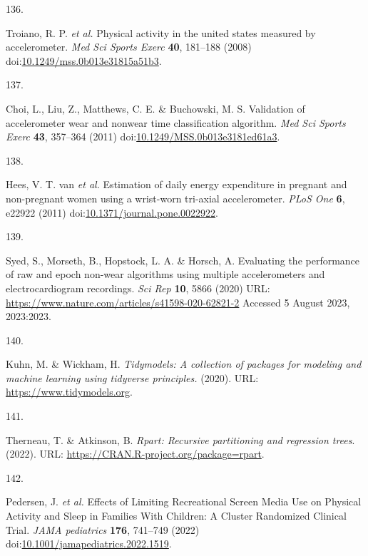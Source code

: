 \documentclass[
  10pt,
]{scrbook}
\newlength{\cslhangindent}
\newlength{\csllabelwidth}
\newlength{\cslentryspacingunit} %
\newenvironment{CSLReferences}[2] %
 {%
  \setlength{\parindent}{0pt}
  \ifodd #1
  \let\oldpar\par
  \def\par{\hangindent=\cslhangindent\oldpar}
  \fi
  \setlength{\parskip}{#2\cslentryspacingunit}
 }%
 {}
\newcommand{\CSLLeftMargin}[1]{\parbox[t]{\csllabelwidth}{#1}}
\newcommand{\CSLRightInline}[1]{\parbox[t]{\linewidth - \csllabelwidth}{#1}\break}
\let\originaltextbf\textbf
\renewcommand{\textbf}[1]{\textcolor{color1}{\originaltextbf{#1}}}
\begin{document}
\begin{CSLReferences}{0}{0}
\leavevmode{}%
\CSLLeftMargin{136. }%
\CSLRightInline{Troiano, R. P. \emph{et al.} Physical activity in the
united states measured by accelerometer. \emph{Med Sci Sports Exerc}
\textbf{40}, 181--188 (2008)
doi:\href{https://doi.org/10.1249/mss.0b013e31815a51b3}{10.1249/mss.0b013e31815a51b3}.}

\leavevmode{}%
\CSLLeftMargin{137. }%
\CSLRightInline{Choi, L., Liu, Z., Matthews, C. E. \& Buchowski, M. S.
Validation of accelerometer wear and nonwear time classification
algorithm. \emph{Med Sci Sports Exerc} \textbf{43}, 357--364 (2011)
doi:\href{https://doi.org/10.1249/MSS.0b013e3181ed61a3}{10.1249/MSS.0b013e3181ed61a3}.}

\leavevmode{}%
\CSLLeftMargin{138. }%
\CSLRightInline{Hees, V. T. van \emph{et al.} Estimation of daily energy
expenditure in pregnant and non-pregnant women using a wrist-worn
tri-axial accelerometer. \emph{{PLoS} One} \textbf{6}, e22922 (2011)
doi:\href{https://doi.org/10.1371/journal.pone.0022922}{10.1371/journal.pone.0022922}.}

\leavevmode{}%
\CSLLeftMargin{139. }%
\CSLRightInline{Syed, S., Morseth, B., Hopstock, L. A. \& Horsch, A.
Evaluating the performance of raw and epoch non-wear algorithms using
multiple accelerometers and electrocardiogram recordings. \emph{Sci Rep}
\textbf{10}, 5866 (2020) URL:
\url{https://www.nature.com/articles/s41598-020-62821-2} Accessed 5
August 2023, 2023:2023.}

\leavevmode{}%
\CSLLeftMargin{140. }%
\CSLRightInline{Kuhn, M. \& Wickham, H. \emph{Tidymodels: A collection
of packages for modeling and machine learning using tidyverse
principles.} (2020). URL: \url{https://www.tidymodels.org}.}

\leavevmode{}%
\CSLLeftMargin{141. }%
\CSLRightInline{Therneau, T. \& Atkinson, B. \emph{Rpart: Recursive
partitioning and regression trees}. (2022). URL:
\url{https://CRAN.R-project.org/package=rpart}.}

\leavevmode{}%
\CSLLeftMargin{142. }%
\CSLRightInline{Pedersen, J. \emph{et al.} Effects of Limiting
Recreational Screen Media Use on Physical Activity and Sleep in Families
With Children: A Cluster Randomized Clinical Trial. \emph{JAMA
pediatrics} \textbf{176}, 741--749 (2022)
doi:\href{https://doi.org/10.1001/jamapediatrics.2022.1519}{10.1001/jamapediatrics.2022.1519}.}


\end{CSLReferences}
\end{document}
